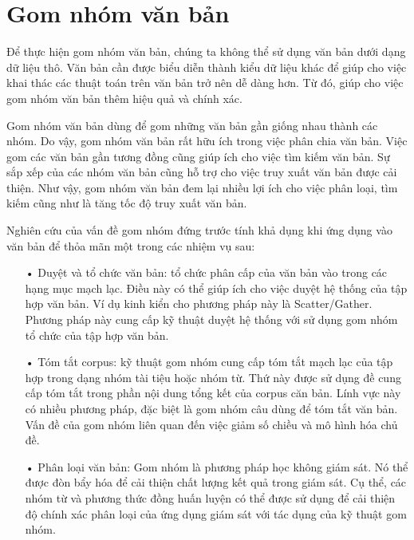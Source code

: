 \section{Gom nhóm văn bản}

Để thực hiện gom nhóm văn bản, chúng ta không thể sử dụng văn bản dưới dạng dữ liệu thô.
Văn bản cần được biểu diễn thành kiểu dữ liệu khác để giúp cho việc khai thác các thuật toán trên văn bản trở nên dễ dàng hơn.
Từ đó, giúp cho việc gom nhóm văn bản thêm hiệu quả và chính xác.


Gom nhóm văn bản dùng để gom những văn bản gần giống nhau thành các nhóm. 
Do vậy, gom nhóm văn bản rất hữu ích trong việc phân chia văn bản.
Việc gom các văn bản gần tương đồng cũng giúp ích cho việc tìm kiếm văn bản.
Sự sắp xếp của các nhóm văn bản cũng hỗ trợ cho việc truy xuất văn bản được cải thiện.
Như vậy, gom nhóm văn bản đem lại nhiều lợi ích cho việc phân loại, tìm kiếm cũng như là tăng tốc độ truy xuất văn bản.


Nghiên cứu của vấn đề gom nhóm đứng trước tính khả dụng khi ứng dụng vào văn bản để thỏa mãn một trong các nhiệm vụ sau:
\begin{enumerate}
\item[•]Duyệt và tổ chức văn bản: tổ chức phân cấp của văn bản vào trong các hạng mục mạch lạc.
Điều này có thể giúp ích cho việc duyệt hệ thống của tập hợp văn bản.
Ví dụ kinh kiển cho phương pháp này là Scatter/Gather.
Phương pháp này cung cấp kỹ thuật duyệt hệ thống với sử dụng gom nhóm tổ chức của tập hợp văn bản.
\item[•]Tóm tắt corpus: kỹ thuật gom nhóm cung cấp tóm tắt mạch lạc của tập hợp trong dạng nhóm tài tiệu hoặc nhóm từ.
Thứ này được sử dụng đề cung cấp tóm tắt trong phần nội dung tổng kết của corpus căn bản.
Lính vực này có nhiều phương pháp, đặc biệt là gom nhóm câu dùng để tóm tắt văn bản.
Vấn đề của gom nhóm liên quan đến việc giảm số chiều và mô hình hóa chủ đề. 
\item[•]Phân loại văn bản: Gom nhóm là phương pháp học không giám sát.
Nó thể được đòn bẩy hóa để cải thiện chất lượng kết quả trong giám sát.
Cụ thể, các nhóm từ và phương thức đồng huấn luyện có thể được sử dụng để cải thiện độ chính xác phân loại của ứng dụng giám sát với tác dụng của kỹ thuật gom nhóm.
\end{enumerate}


